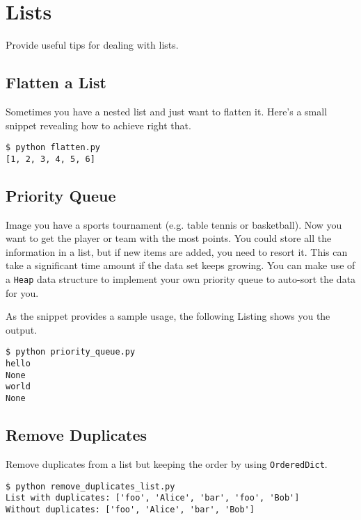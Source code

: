 
\section{Lists}

Provide useful tips for dealing with lists.


\subsection{Flatten a List}

Sometimes you have a nested list and just want to flatten it.
Here's a small snippet revealing how to achieve right that.



\begin{lstlisting}[caption=Output of flatten.py]
$ python flatten.py
[1, 2, 3, 4, 5, 6]
\end{lstlisting}


\subsection{Priority Queue}

Image you have a sports tournament (e.g. table tennis or basketball).
Now you want to get the player or team with the most points.
You could store all the information in a list, but if new items are added, you need to resort it.
This can take a significant time amount if the data set keeps growing.
You can make use of a \lstinline{Heap} data structure to implement your own priority queue to auto-sort the data for you.



As the snippet provides a sample usage, the following Listing shows you the output.

\begin{lstlisting}[caption=Output of priority\_queue.py]
$ python priority_queue.py
hello
None
world
None
\end{lstlisting}


\subsection{Remove Duplicates}

Remove duplicates from a list but keeping the order by using \lstinline{OrderedDict}.



\begin{lstlisting}[caption=Output of remove\_duplicates\_list.py]
$ python remove_duplicates_list.py
List with duplicates: ['foo', 'Alice', 'bar', 'foo', 'Bob']
Without duplicates: ['foo', 'Alice', 'bar', 'Bob']
\end{lstlisting}
